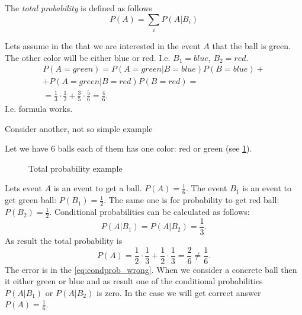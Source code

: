 \begin{proposition}

The \textit{total probability} is defined as follows
\[
P(A) = \sum_i P(A|B_i)
\]
\label{thm:totalprobability}
\end{proposition}

\begin{example}
Lets assume in the  that we are
interested in the event $A$ that the ball is green. The other color
will be either blue or red. I.e. $B_1 = blue$, $B_2 = red$.
\begin{eqnarray}
P(A = green) = P(A = green|B = blue) P(B = blue) +
\nonumber \\
+
P(A = green|B = red) P(B = red) =
\nonumber \\
= \frac{1}{3} \cdot \frac{1}{2} + \frac{3}{5}\cdot \frac{5}{6} = \frac{4}{6}.
\nonumber
\end{eqnarray}
I.e. formula works.
\end{example}

Consider another, not so simple example
\begin{example}
Let we have 6 balls each of them has one color: red or green (see
\cref{fig:excondprobability_add}). 
\begin{figure}[H]
  \centering
  \caption{Total probability example}
  \label{fig:excondprobability_add}
\end{figure}
Lets event $A$ is an event to get a ball. $P(A) = \frac{1}{6}$. The
event $B_1$ is an event to get green ball: $P(B_1) = \frac{1}{2}$. The
same one is for probability to get red ball: $P(B_2) = \frac{1}{2}$.
Conditional probabilities can be calculated as follows:
\begin{equation}
P(A|B_1) = P(A|B_2) = \frac{1}{3}.
\label{eq:condprob_wrong}
\end{equation}
As result the total probability is 
\[
P(A) = \frac{1}{2}\cdot\frac{1}{3} + \frac{1}{2}\cdot\frac{1}{3} =
\frac{2}{6} \ne \frac{1}{6}.
\]
The error is in the \eqref{eq:condprob_wrong}. When we consider a
concrete ball then it either green or blue and as result one of the
conditional probabilities $P(A|B_1)$ or $P(A|B_2)$ is zero. In the
case we will get correct answer $P(A) = \frac{1}{6}$.
\end{example}

